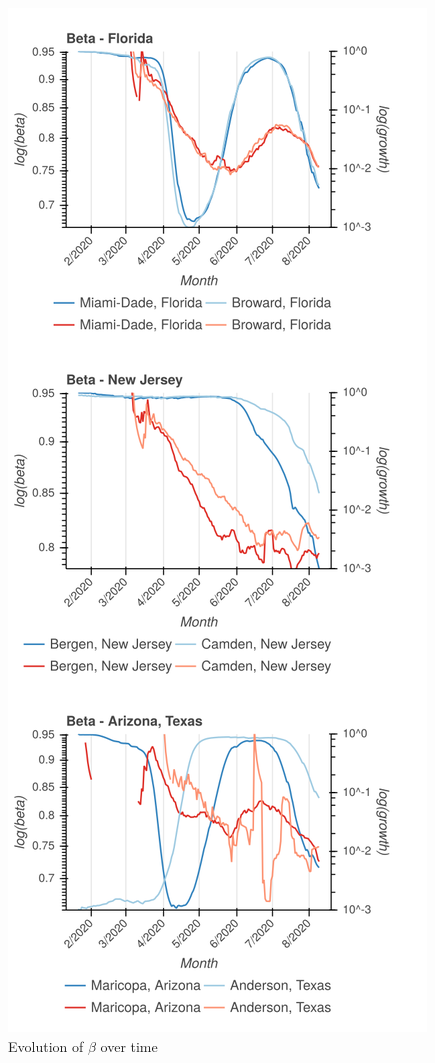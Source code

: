 \begin{figure}
\includegraphics[width=\columnwidth]{img/betas.png}
\caption{Evolution of \(\beta\) over time}
\end{figure}



